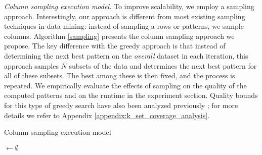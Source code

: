 \textit{Column sampling execution model.} To improve scalability, we employ a sampling approach. Interestingly, our approach is different from most existing sampling techniques in data mining: instead of sampling a rows or patterns, we sample columns. Algorithm \ref{sampling} presents the column sampling approach we propose. The key difference with the greedy approach is that instead of determining the 
next best pattern on the {\em overall} dataset in each iteration, this approach samples $N$ subsets of the data
and determines the next best pattern for all of these subsets. The best among these is then fixed,
and the process is repeated. We empirically evaluate the effects of sampling
on the quality of the computed patterns and on the runtime in the experiment section. \changesb Quality bounds for this type of greedy search have also been analyzed previously \citep{max_k_set_cover1}; for more details we refer to Appendix \ref{appendix:k_set_coverage_analysis}. \changese
\begin{algorithm}[thb]
  \small
 \caption{Column sampling execution model}
 \label{sampling}
 \tiles$ \gets \emptyset$\;
  \normalsize
\end{algorithm}

